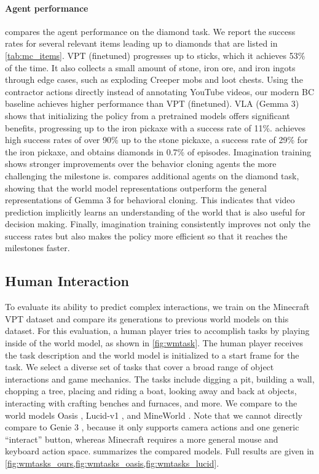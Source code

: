 \documentclass[11pt]{article}
\begin{document}


\paragraph{Agent performance}
 compares the agent performance on the diamond task.
We report the success rates for several relevant items leading up to diamonds that are listed in \cref{tab:mc_items}.
VPT (finetuned) progresses up to sticks, which it achieves 53\% of the time.
It also collects a small amount of stone, iron ore, and iron ingots through edge cases, such as exploding Creeper mobs and loot chests.
Using the contractor actions directly instead of annotating YouTube videos, our modern BC baseline achieves higher performance than VPT (finetuned).
VLA (Gemma 3) shows that initializing the policy from a pretrained models offers significant benefits, progressing up to the iron pickaxe with a success rate of 11\%.
\method achieves high success rates of over 90\% up to the stone pickaxe, a success rate of 29\% for the iron pickaxe, and obtains diamonds in 0.7\% of episodes.
Imagination training shows stronger improvements over the behavior cloning agents the more challenging the milestone is.
 compares additional agents on the diamond task, showing that the world model representations outperform the general representations of Gemma 3 for behavioral cloning.
This indicates that video prediction implicitly learns an understanding of the world that is also useful for decision making.
Finally, imagination training consistently improves not only the success rates but also makes the policy more efficient so that it reaches the milestones faster.

\subsection{Human Interaction}
\label{sec:interact}

To evaluate its ability to predict complex interactions, we train \method on the Minecraft VPT dataset \citep{vpt} and compare its generations to previous world models on this dataset.
For this evaluation, a human player tries to accomplish tasks by playing inside of the world model, as shown in \cref{fig:wmtask}.
The human player receives the task description and the world model is initialized to a start frame for the task.
We select a diverse set of tasks that cover a broad range of object interactions and game mechanics.
The tasks include digging a pit, building a wall, chopping a tree, placing and riding a boat, looking away and back at objects, interacting with crafting benches and furnaces, and more.
We compare \method to the world models Oasis \citep{oasis}, Lucid-v1 \citep{lucidv1}, and MineWorld \citep{mineworld}.
Note that we cannot directly compare to Genie 3 \citep{genie3}, because it only supports camera actions and one generic ``interact'' button, whereas Minecraft requires a more general mouse and keyboard action space.
 summarizes the compared models.
Full results are given in \cref{fig:wmtasks_ours,fig:wmtasks_oasis,fig:wmtasks_lucid}.
\end{document}
